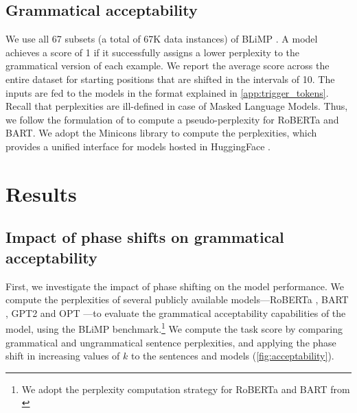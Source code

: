 \documentclass[letterpaper, 12pt]{report}
\begin{document}
\subsection{Grammatical acceptability}
We use all 67 subsets (a total of 67K data instances) of BLiMP \cite{warstadt-etal-2020-BLiMP-benchmark}. A model achieves a score of 1 if it successfully assigns a lower perplexity to the grammatical version of each example. We report the average score across the entire dataset for starting positions that are shifted in the intervals of 10.
The inputs are fed to the models in the format explained in \autoref{app:trigger_tokens}.
Recall that perplexities are ill-defined in case of Masked Language Models. Thus, we follow the formulation of \citet{salazar2019masked} to compute a pseudo-perplexity for RoBERTa and BART.
We adopt the Minicons \cite{misra2022minicons} library to compute the perplexities, which provides a unified interface for models hosted in HuggingFace \citep{huggingface}.




\section{Results}
\label{sec:pos_results}

\subsection{Impact of phase shifts on grammatical acceptability}
\label{sec:pos_acceptability}





First, we investigate the impact of phase shifting on the model performance.
We compute the perplexities of several publicly available models---RoBERTa \citep{Liu2019:RoBERTa}, BART \citep{Lewis2020:BART}, GPT2 \citep{Radford2019:GPT2} and OPT \citep{Zhang2022:OPT}---to evaluate the grammatical acceptability capabilities of the model, using the BLiMP \cite{warstadt-etal-2020-BLiMP-benchmark} benchmark.\footnote{We adopt the perplexity computation strategy for RoBERTa and BART from \citet{salazar2019masked}}
We compute the task score by comparing grammatical and ungrammatical sentence perplexities, and applying the phase shift in increasing values of $k$ to the sentences and models (\autoref{fig:acceptability}).
\end{document}
